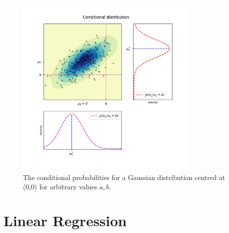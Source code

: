 \documentclass[10pt,a4paper]{article}
\numberwithin{equation}{section}
\theoremstyle{plain}
\theoremstyle{definition}
\theoremstyle{own}
\begin{document}
\begin{figure}[H]
\centering
\includegraphics[width=0.8\textwidth]{cond_norm}
\caption{The conditional probabilities for a Gaussian distribution centred at (0,0) for arbitrary values $a,b$.}
\end{figure}
\pagebreak
\part{Linear Regression}
\end{document}
